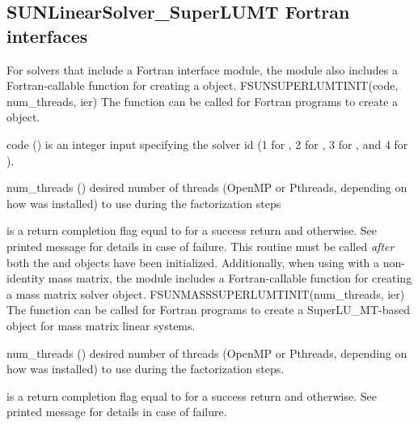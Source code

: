 \subsection{SUNLinearSolver\_SuperLUMT Fortran interfaces}
\label{ss:sunlinsol_slumt_fortran}

For solvers that include a Fortran interface module, the
{\sunlinsolslumt} module also includes a Fortran-callable function
for creating a  object.
%
%
{
  FSUNSUPERLUMTINIT(code, num\_threads, ier)
}
{
  The function  can be called for Fortran programs
  to create a {\sunlinsolklu} object.
}
{
  \begin{args}
  \item[code] ()
    is an integer input specifying the solver id (1 for {\cvode}, 2
    for {\ida}, 3 for {\kinsol}, and 4 for {\arkode}).
  \item[num\_threads] ()
    desired number of threads (OpenMP or Pthreads, depending on how
    {\superlumt} was installed) to use during the factorization steps
  \end{args}
}
{
   is a return completion flag equal to  for a success
  return and  otherwise. See printed message for details in case
  of failure.
}
{
  This routine must be
  called \emph{after} both the {\nvector} and {\sunmatrix} objects have
  been initialized.
}
Additionally, when using {\arkode} with a non-identity
mass matrix, the {\sunlinsolslumt} module includes a Fortran-callable
function for creating a  mass matrix solver
object.
%
%
{
  FSUNMASSSUPERLUMTINIT(num\_threads, ier)
}
{
  The function  can be called for Fortran programs
  to create a SuperLU\_MT-based  object for mass matrix linear
  systems.
}
{
  \begin{args}
  \item[num\_threads] ()
    desired number of threads (OpenMP or Pthreads, depending on how
    {\superlumt} was installed) to use during the factorization steps.
  \end{args}
}
{
   is a  return completion flag equal to  for a success
  return and  otherwise. See printed message for details in case
  of failure.
}
